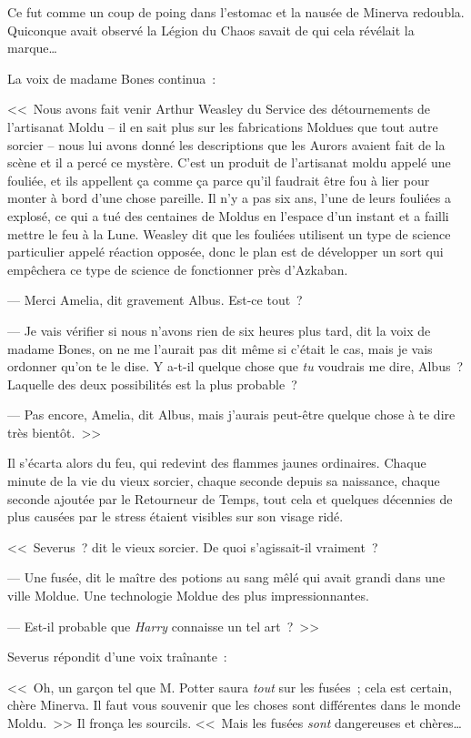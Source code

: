 Ce fut comme un coup de poing dans l'estomac et la nausée de Minerva redoubla. Quiconque avait observé la Légion du Chaos savait de qui cela révélait la marque…

La voix de madame Bones continua~:

<<~Nous avons fait venir Arthur Weasley du Service des détournements de l'artisanat Moldu -- il en sait plus sur les fabrications Moldues que tout autre sorcier -- nous lui avons donné les descriptions que les Aurors avaient fait de la scène et il a percé ce mystère. C'est un produit de l'artisanat moldu appelé une fouliée, et ils appellent ça comme ça parce qu'il faudrait être fou à lier pour monter à bord d'une chose pareille. Il n'y a pas six ans, l'une de leurs fouliées a explosé, ce qui a tué des centaines de Moldus en l'espace d'un instant et a failli mettre le feu à la Lune. Weasley dit que les fouliées utilisent un type de science particulier appelé réaction opposée, donc le plan est de développer un sort qui empêchera ce type de science de fonctionner près d'Azkaban.

--- Merci Amelia, dit gravement Albus. Est-ce tout~?

--- Je vais vérifier si nous n'avons rien de six heures plus tard, dit la voix de madame Bones, on ne me l'aurait pas dit même si c'était le cas, mais je vais ordonner qu'on te le dise. Y a-t-il quelque chose que \emph{tu} voudrais me dire, Albus~? Laquelle des deux possibilités est la plus probable~?

--- Pas encore, Amelia, dit Albus, mais j'aurais peut-être quelque chose à te dire très bientôt.~>>

Il s'écarta alors du feu, qui redevint des flammes jaunes ordinaires. Chaque minute de la vie du vieux sorcier, chaque seconde depuis sa naissance, chaque seconde ajoutée par le Retourneur de Temps, tout cela et quelques décennies de plus causées par le stress étaient visibles sur son visage ridé.

<<~Severus~? dit le vieux sorcier. De quoi s'agissait-il vraiment~?

--- Une fusée, dit le maître des potions au sang mêlé qui avait grandi dans une ville Moldue. Une technologie Moldue des plus impressionnantes.

--- Est-il probable que \emph{Harry} connaisse un tel art~?~>>

Severus répondit d'une voix traînante~:

<<~Oh, un garçon tel que M. Potter saura \emph{tout} sur les fusées~; cela est certain, chère Minerva. Il faut vous souvenir que les choses sont différentes dans le monde Moldu.~>> Il fronça les sourcils. <<~Mais les fusées \emph{sont} dangereuses et chères…

